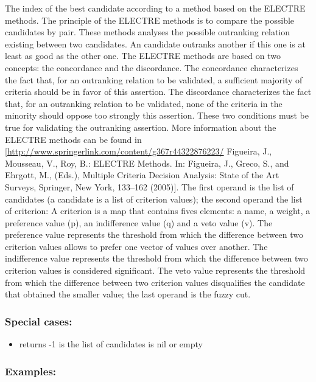 \documentclass[]{book}
\providecommand{\tightlist}{%
  \setlength{\itemsep}{0pt}\setlength{\parskip}{0pt}}
\theoremstyle{definition}
\theoremstyle{definition}
\theoremstyle{definition}
\theoremstyle{remark}
\begin{document}
The index of the best candidate according to a method based on the
ELECTRE methods. The principle of the ELECTRE methods is to compare the
possible candidates by pair. These methods analyses the possible
outranking relation existing between two candidates. An candidate
outranks another if this one is at least as good as the other one. The
ELECTRE methods are based on two concepts: the concordance and the
discordance. The concordance characterizes the fact that, for an
outranking relation to be validated, a sufficient majority of criteria
should be in favor of this assertion. The discordance characterizes the
fact that, for an outranking relation to be validated, none of the
criteria in the minority should oppose too strongly this assertion.
These two conditions must be true for validating the outranking
assertion. More information about the ELECTRE methods can be found in
{[}\url{http://www.springerlink.com/content/g367r44322876223/} Figueira,
J., Mousseau, V., Roy, B.: ELECTRE Methods. In: Figueira, J., Greco, S.,
and Ehrgott, M., (Eds.), Multiple Criteria Decision Analysis: State of
the Art Surveys, Springer, New York, 133--162 (2005){]}. The first
operand is the list of candidates (a candidate is a list of criterion
values); the second operand the list of criterion: A criterion is a map
that contains fives elements: a name, a weight, a preference value (p),
an indifference value (q) and a veto value (v). The preference value
represents the threshold from which the difference between two criterion
values allows to prefer one vector of values over another. The
indifference value represents the threshold from which the difference
between two criterion values is considered significant. The veto value
represents the threshold from which the difference between two criterion
values disqualifies the candidate that obtained the smaller value; the
last operand is the fuzzy cut.

\subsubsection{Special cases:}\label{special-cases-53}

\begin{itemize}
\tightlist
\item
  returns -1 is the list of candidates is nil or empty
\end{itemize}

\subsubsection{Examples:}\label{examples-112}
\end{document}
